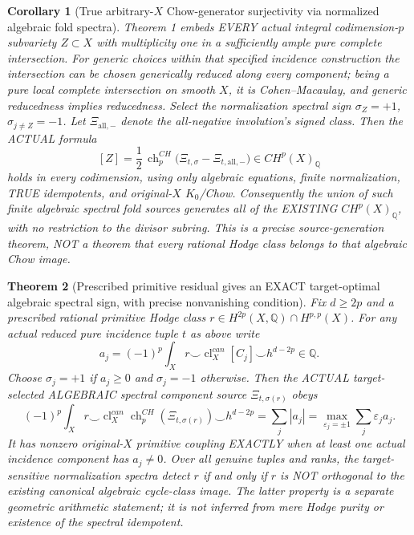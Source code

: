 \documentclass[11pt]{article}
\newtheorem{theorem}{Theorem}
\newtheorem{corollary}[theorem]{Corollary}
\begin{document}
\begin{corollary}[True arbitrary-$X$ Chow-generator surjectivity via normalized algebraic fold spectra]
Theorem 1 embeds EVERY actual integral
codimension-$p$ subvariety $Z\subset X$
with multiplicity one in a sufficiently
ample pure complete intersection.
For generic choices within that
specified incidence construction the
intersection can be chosen generically
reduced along every component; being a
pure local complete intersection on
smooth $X$, it is Cohen--Macaulay, and
generic reducedness implies reducedness.
Select the normalization spectral sign
$\sigma_Z=+1$, $\sigma_{j\ne Z}=-1$.
Let $\Xi_{\mathrm{all},-}$ denote the
all-negative involution's signed class.
Then the ACTUAL formula
\[
 \boxed{
 [Z]=\frac12\,\operatorname{ch}_p^{CH}
 \bigl(\Xi_{t,\sigma}-\Xi_{t,\mathrm{all},-}\bigr)
 \in CH^p(X)_{\mathbb Q}
 }                                                        \tag{10}
\]
holds in every codimension, using
only algebraic equations, finite
normalization, TRUE idempotents, and
original-$X$ $K_0$/Chow.
Consequently the union of such
finite algebraic spectral fold sources
generates all of the EXISTING
$CH^p(X)_{\mathbb Q}$, with no
restriction to the divisor subring.
This is a precise source-generation
theorem, NOT a theorem that every
rational Hodge class belongs to
that algebraic Chow image.
\end{corollary}

\begin{theorem}[Prescribed primitive residual gives an EXACT target-optimal algebraic spectral sign, with precise nonvanishing condition]
Fix $d\ge 2p$ and a prescribed
rational primitive Hodge class
$r\in H^{2p}(X,\mathbb Q)\cap H^{p,p}(X)$.
For any actual reduced pure
incidence tuple $t$ as above write
\[
 a_j=(-1)^p\int_X
 r\smile\operatorname{cl}^{can}_X[C_j]
         \smile h^{d-2p}\in\mathbb Q .
\]
Choose $\sigma_j=+1$ if $a_j\ge0$
and $\sigma_j=-1$ otherwise.
Then the ACTUAL target-selected
ALGEBRAIC spectral component source
$\Xi_{t,\sigma(r)}$ obeys
\[
 \boxed{
 (-1)^p\int_Xr\smile
   \operatorname{cl}^{can}_X
      \operatorname{ch}^{CH}_p(\Xi_{t,\sigma(r)})
             \smile h^{d-2p}
       =\sum_j|a_j|
       =\max_{\varepsilon_j=\pm1}
                      \sum_j\varepsilon_j a_j .
 }                                                        \tag{11}
\]
It has nonzero original-$X$ primitive
coupling EXACTLY when at least one
actual incidence component has
$a_j\ne0$.
Over all genuine tuples and ranks,
the target-sensitive normalization
spectra detect $r$ if and only if
$r$ is NOT orthogonal to the
existing canonical algebraic
cycle-class image.
The latter property is a separate
geometric arithmetic statement; it
is not inferred from mere Hodge
purity or existence of the spectral
idempotent.
\end{theorem}
\end{document}
